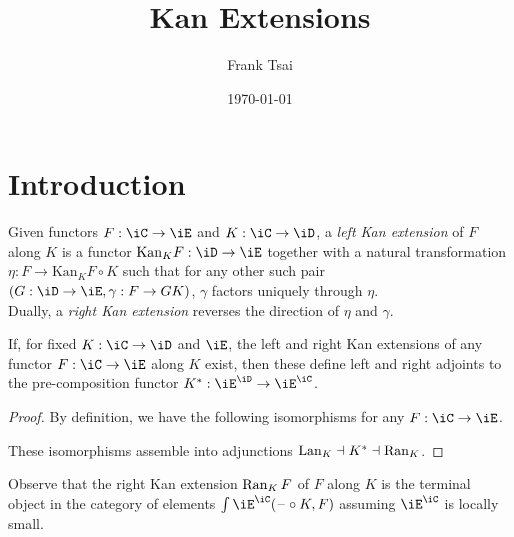 \documentclass{amsart}
\title{Kan Extensions}
\author{Frank Tsai}
\date{\today}
\begin{document}
\maketitle
\tableofcontents

\section{Introduction}
\label{sec:introduction}
\begin{defn}
  Given functors $F : \iC \to \iE$ and $K : \iC \to \iD$, a \emph{left Kan extension} of $F$ along $K$ is a functor $\mathrm{Kan}_{K}F : \iD \to \iE$ together with a natural transformation $\eta : F \to \mathrm{Kan}_{K} F \circ K$ such that for any other such pair $(G : \iD \to \iE, \gamma : F \to GK)$, $\gamma$ factors uniquely through $\eta$.
  \[\]
  Dually, a \emph{right Kan extension} reverses the direction of $\eta$ and $\gamma$.
\end{defn}

\begin{prop}
  If, for fixed $K : \iC \to \iD$ and $\iE$, the left and right Kan extensions of any functor $F : \iC \to \iE$ along $K$ exist, then these define left and right adjoints to the pre-composition functor $K^{*} : \iE^{\iD} \to \iE^{\iC}$.
  \[\]
\end{prop}
\begin{proof}
  By definition, we have the following isomorphisms for any $F : \iC \to \iE$.
  These isomorphisms assemble into adjunctions $\operatorname{Lan}_{K} \dashv K^{*} \dashv \operatorname{Ran}_{K}$.
\end{proof}

Observe that the right Kan extension $\operatorname{Ran}_{K}F$ of $F$ along $K$ is the terminal object in the category of elements $\int\iE^{\iC}(\blank \circ K, F)$ assuming $\iE^{\iC}$ is locally small.



\end{document}
